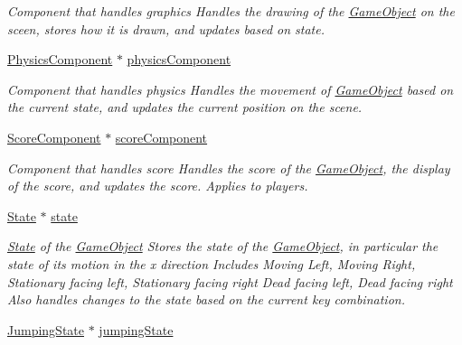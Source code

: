 \begin{DoxyCompactItemize}
\begin{DoxyCompactList}\small\item\em Component that handles graphics Handles the drawing of the \hyperlink{classGameObject}{Game\-Object} on the sceen, stores how it is drawn, and updates based on state. \end{DoxyCompactList}\item 
\hypertarget{classGameObject_a670ef0bb2154d5941a3da1c8ed45a0b8}{\hyperlink{classPhysicsComponent}{Physics\-Component} $\ast$ \hyperlink{classGameObject_a670ef0bb2154d5941a3da1c8ed45a0b8}{physics\-Component}}\label{classGameObject_a670ef0bb2154d5941a3da1c8ed45a0b8}

\begin{DoxyCompactList}\small\item\em Component that handles physics Handles the movement of \hyperlink{classGameObject}{Game\-Object} based on the current state, and updates the current position on the scene. \end{DoxyCompactList}\item 
\hypertarget{classGameObject_a944d6d66cb7b92a474a4fe35a477897d}{\hyperlink{classScoreComponent}{Score\-Component} $\ast$ \hyperlink{classGameObject_a944d6d66cb7b92a474a4fe35a477897d}{score\-Component}}\label{classGameObject_a944d6d66cb7b92a474a4fe35a477897d}

\begin{DoxyCompactList}\small\item\em Component that handles score Handles the score of the \hyperlink{classGameObject}{Game\-Object}, the display of the score, and updates the score. Applies to players. \end{DoxyCompactList}\item 
\hypertarget{classGameObject_a787f40d5aee7507cdd6b8bb61dd8c19f}{\hyperlink{classState}{State} $\ast$ \hyperlink{classGameObject_a787f40d5aee7507cdd6b8bb61dd8c19f}{state}}\label{classGameObject_a787f40d5aee7507cdd6b8bb61dd8c19f}

\begin{DoxyCompactList}\small\item\em \hyperlink{classState}{State} of the \hyperlink{classGameObject}{Game\-Object} Stores the state of the \hyperlink{classGameObject}{Game\-Object}, in particular the state of its motion in the x direction Includes Moving Left, Moving Right, Stationary facing left, Stationary facing right Dead facing left, Dead facing right Also handles changes to the state based on the current key combination. \end{DoxyCompactList}\item 
\hypertarget{classGameObject_a980519676ac2aa7768729c01d768dad7}{\hyperlink{classJumpingState}{Jumping\-State} $\ast$ \hyperlink{classGameObject_a980519676ac2aa7768729c01d768dad7}{jumping\-State}}\label{classGameObject_a980519676ac2aa7768729c01d768dad7}


\end{DoxyCompactItemize}

